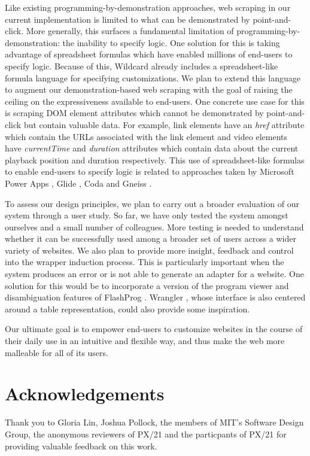 \documentclass[sigconf,10pt]{acmart}
\begin{document}
Like existing programming-by-demonstration approaches, web scraping in
our current implementation is limited to what can be demonstrated by
point-and-click. More generally, this surfaces a fundamental limitation
of programming-by-demonstration: the inability to specify logic. One
solution for this is taking advantage of spreadsheet formulas which have
enabled millions of end-users to specify logic. Because of this,
Wildcard already includes a spreadsheet-like formula language for
specifying customizations. We plan to extend this language to augment
our demonstration-based web scraping with the goal of raising the
ceiling on the expressiveness available to end-users. One concrete use
case for this is scraping DOM element attributes which cannot be
demonstrated by point-and-click but contain valuable data. For example,
link elements have an \emph{href} attribute which contain the URLs
associated with the link element and video elements have
\emph{currentTime} and \emph{duration} attributes which contain data
about the current playback position and duration respectively. This use
of spreadsheet-like formulas to enable end-users to specify logic is
related to approaches taken by Microsoft Power Apps \citep{zotero-94},
Glide \citep{zotero-108}, Coda \citep{zotero-110} and Gneiss
\citep{chang2014}.

To assess our design principles, we plan to carry out a broader
evaluation of our system through a user study. So far, we have only
tested the system amongst ourselves and a small number of colleagues.
More testing is needed to understand whether it can be successfully used
among a broader set of users across a wider variety of websites. We also
plan to provide more insight, feedback and control into the wrapper
induction process. This is particularly important when the system
produces an error or is not able to generate an adapter for a website.
One solution for this would be to incorporate a version of the program
viewer and disambiguation features of FlashProg \citep{mayer2015}.
Wrangler \citep{kandel2011}, whose interface is also centered around a
table representation, could also provide some inspiration.

Our ultimate goal is to empower end-users to customize websites in the
course of their daily use in an intuitive and flexible way, and thus
make the web more malleable for all of its users.

\hypertarget{acknowledgements}{%
\section{Acknowledgements}\label{acknowledgements}}

Thank you to Gloria Lin, Joshua Pollock, the members of MIT's Software
Design Group, the anonymous reviewers of PX/21 and the particpants of
PX/21 for providing valuable feedback on this work.




\end{document}
